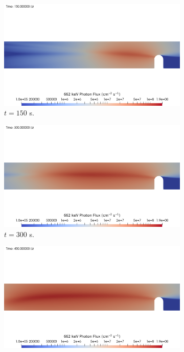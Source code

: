 \begin{figure}[H]
    \centering
    \begin{subfigure}[b]{0.68\textwidth}
        \centering
        \includegraphics[width=\textwidth]{images/demos/plume/photon/flux_log_150s.png}
        \caption{$t = 150$ s.}
        \label{fig:demo:plume:rad:photon:150}
    \end{subfigure}
    \hfill
    \begin{subfigure}[b]{0.68\textwidth}
        \centering
        \includegraphics[width=\textwidth]{images/demos/plume/photon/flux_log_300s.png}
        \caption{$t = 300$ s.}
        \label{fig:demo:plume:rad:photon:300}
    \end{subfigure}
    \hfill
    \begin{subfigure}[b]{0.68\textwidth}
        \centering
        \includegraphics[width=\textwidth]{images/demos/plume/photon/flux_log_450s.png}

\end{subfigure}
\end{figure}
